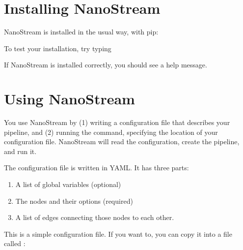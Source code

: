 \documentclass[letterpaper,10pt,english]{sphinxmanual}
\begin{document}
\section{Installing NanoStream}
\label{\detokenize{treehorn:installing-nanostream}}
NanoStream is installed in the usual way, with pip:

%
\begin{sphinxVerbatim}[commandchars=\\\{\}]
  
\end{sphinxVerbatim}

To test your installation, try typing

%
\begin{sphinxVerbatim}[commandchars=\\\{\}]
 
\end{sphinxVerbatim}

If NanoStream is installed correctly, you should see a help message.


\section{Using NanoStream}
\label{\detokenize{treehorn:using-nanostream}}
You use NanoStream by (1) writing a configuration file that describes your pipeline, and (2) running the  command, specifying the location of your
configuration file. NanoStream will read the configuration, create the pipeline,
and run it.

The configuration file is written in YAML. It has three parts:
\begin{enumerate}
\def\theenumi{\arabic{enumi}}
\def\labelenumi{\theenumi .}
\makeatletter\def\p@enumii{\p@enumi \theenumi .}\makeatother
\item {} 
A list of global variables (optional)

\item {} 
The nodes and their options (required)

\item {} 
A list of edges connecting those nodes to each other.

\end{enumerate}

This is a simple configuration file. If you want to, you can copy it into a
file called :
\end{document}
